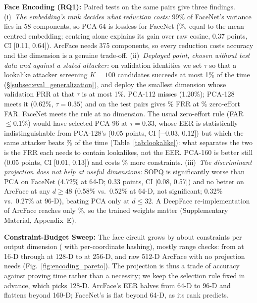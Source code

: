 \documentclass[10pt,letterpaper,journal]{IEEEtran}
\begin{document}
\textbf{Face Encoding (RQ1):} Paired tests on the same pairs give three findings.
(i)~\emph{The embedding's rank decides what reduction costs:} 99\% of FaceNet's variance lies in 58 components, so PCA-64 is lossless for FaceNet (\nFacenetEer\%, equal to the mean-centred embedding; centring alone explains its gain over raw cosine, 0.37 points, CI [0.11, 0.64]). ArcFace needs 375 components, so every reduction costs accuracy and the dimension is a genuine trade-off.
(ii)~\emph{Deployed point, chosen without test data and against a stated attacker:} on validation identities we set $\tau$ so that a lookalike attacker screening $K = 100$ candidates succeeds at most 1\% of the time (\S\ref{subsec:eval_generalization}), and deploy the smallest dimension whose validation FRR at that $\tau$ is at most 1\%. PCA-112 misses (1.20\%); PCA-128 meets it (0.62\%, $\tau = 0.35$) and on the test pairs gives \nFrr\% FRR at \nFar\% zero-effort FAR. FaceNet meets the rule at no dimension. The usual zero-effort rule (FAR $\le 0.1\%$) would have selected PCA-96 at $\tau = 0.33$, whose EER is statistically indistinguishable from PCA-128's (0.05 points, CI [$-0.03$, 0.12]) but which the same attacker beats \nZeLookLfwHundred\% of the time (Table~\ref{tab:lookalike}): what separates the two is the FRR each needs to contain lookalikes, not the EER. PCA-160 is better still (0.05 points, CI [0.01, 0.13]) and costs \nOneSixtyExtra\% more constraints.
(iii)~\emph{The discriminant projection does not help at useful dimensions:} SOPQ is significantly worse than PCA on FaceNet (4.72\% at 64-D; 0.33 points, CI [0.08, 0.57]) and no better on ArcFace at any $d \ge 48$ (0.58\% vs.\ 0.52\% at 64-D, not significant; 0.32\% vs.\ 0.27\% at 96-D), beating PCA only at $d \le 32$. A DeepFace re-implementation of ArcFace reaches only \nDeepfaceEer\%, so the trained weights matter (Supplementary Material, Appendix~E).

\textbf{Constraint-Budget Sweep:} The face circuit grows by about \nPerDim{} constraints per output dimension (\nChunkedPerDim{} with per-coordinate hashing), mostly range checks: from \nFullCosSixteen{} at 16-D through \nFaceConstraints{} at 128-D to \nFullCosTwoFiftySix{} at 256-D, and raw 512-D ArcFace with no projection needs \nFullCosFiveTwelve{} (Fig.~\ref{fig:encoding_pareto}). The projection is thus a trade of accuracy against proving time rather than a necessity; we keep the selection rule fixed in advance, which picks 128-D. ArcFace's EER halves from 64-D to 96-D and flattens beyond 160-D; FaceNet's is flat beyond 64-D, as its rank predicts.
\end{document}

